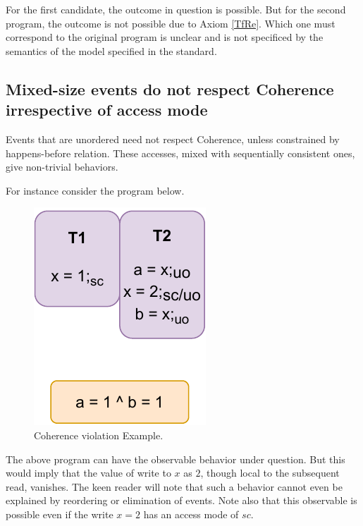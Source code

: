         For the first candidate, the outcome in question is possible.
        But for the second program, the outcome is not possible due to Axiom \ref{TfRe}.
        Which one must correspond to the original program is unclear and is not specificed by the semantics of the model specified in the standard.

    \subsection{Mixed-size events do not respect Coherence irrespective of access mode}

        Events that are unordered need not respect Coherence, unless constrained by happens-before relation.
        These accesses, mixed with sequentially consistent ones, give non-trivial behaviors.

        For instance  consider the program below.

        \begin{figure}[H]
            \centering
            \includegraphics[scale=0.7]{7.ConclusionFutureWork/CoherenceNormal.pdf}
            \caption{Coherence violation Example.}
        \end{figure}


        The above program can have the observable behavior under question.
        But this would imply that the value of write to $x$ as $2$, though local to the subsequent read, vanishes. 
        The keen reader will note that such a behavior cannot even be explained by reordering or elimination of events.
        Note also that this observable is possible even if the write $x=2$ has an access mode of $sc$. 

